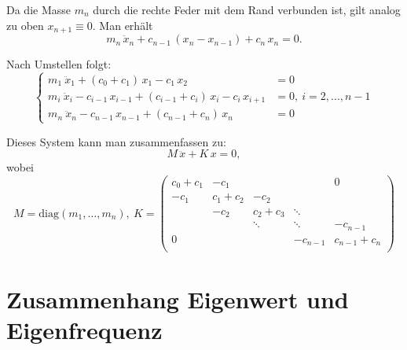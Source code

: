 \documentclass[ngerman,BCOR=4mm]{tudscrreprt}
\theoremstyle{plain} %
\theoremstyle{definition} %
\theoremstyle{remark}
\begin{document}
            Da die Masse $m_n$ durch die rechte Feder mit dem Rand verbunden ist, gilt analog zu oben $x_{n+1} \equiv 0$.
            Man erhält
            $$m_n\,\ddot x_n + c_{n-1}\,(x_n-x_{n-1}) + c_n\,x_n = 0.$$  

            Nach Umstellen folgt:
            \begin{equation}
                  \label{eqn: System GDgl MK 1d}
                  \begin{cases}
                        m_1\ \ddot x_1 + (c_0+c_1)\,x_1 - c_1\,x_2 & = 0   \\
                        m_i\ \ddot x_i - c_{i-1}\,x_{i-1} + (c_{i-1}+c_i)\,x_i -c_i\,x_{i+1} & = 0,\ i=2,...,n-1 \\
                        m_n\ \ddot x_n - c_{n-1}\,x_{n-1} + (c_{n-1}+c_n)\,x_n & = 0
                  \end{cases}
            \end{equation}

            Dieses System kann man zusammenfassen zu:
            $$M\,\ddot x + K\,x = 0,$$
            \renewcommand{\arraystretch}{1.5}
            wobei $$M= \text{diag}(m_1,\dots,m_n),\ 
            K = \begin{pmatrix}
                  c_0+c_1 & -c_1 &  &  & 0 \\
                  -c_1 & c_1+c_2 & -c_2 &  &  \\
                   & -c_2 & c_2+c_3 & \ddots &  \\
                    &  & \ddots & \ddots  & -c_{n-1} \\
                   0&  & & -c_{n-1} & c_{n-1}+c_n \\
                  \end{pmatrix}$$

                  
            \renewcommand{\arraystretch}{1}



      \section{Zusammenhang Eigenwert und Eigenfrequenz}
            
\end{document}

